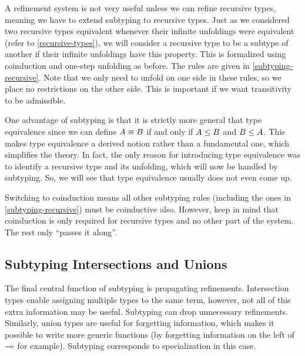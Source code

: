 A refinement system is not very useful unless we can refine recursive types, meaning we have to extend subtyping to recursive types. Just as we considered two recursive types equivalent whenever their infinite unfoldings were equivalent (refer to \cref{recursive-types}), we will consider a recursive type to be a subtype of another if their infinite unfoldings have this property. This is formalized using coinduction and one-step unfolding as before. The rules are given in \cref{subtyping-recursive}. Note that we only need to unfold on one side in these rules, so we place no restrictions on the other side. This is important if we want transitivity to be admissible.


One advantage of subtyping is that it is strictly more general that type equivalence since we can define $A \equiv B$ if and only if $A \le B$ and $B \le A$. This makes type equivalence a derived notion rather than a fundamental one, which simplifies the theory. In fact, the only reason for introducing type equivalence was to identify a recursive type and its unfolding, which will now be handled by subtyping. So, we will see that type equivalence usually does not even come up.

Switching to coinduction means all other subtyping rules (including the ones in \cref{subtyping-recursive}) must be coinductive also. However, keep in mind that coinduction is only required for recursive types and no other part of the system. The rest only ``passes it along''.


\subsection{Subtyping Intersections and Unions}

The final central function of subtyping is propagating refinements. Intersection types enable assigning multiple types to the same term, however, not all of this extra information may be useful. Subtyping can drop unnecessary refinements. Similarly, union types are useful for forgetting information, which makes it possible to write more generic functions (by forgetting information on the left of $\multimap$ for example). Subtyping corresponds to specialization in this case.

